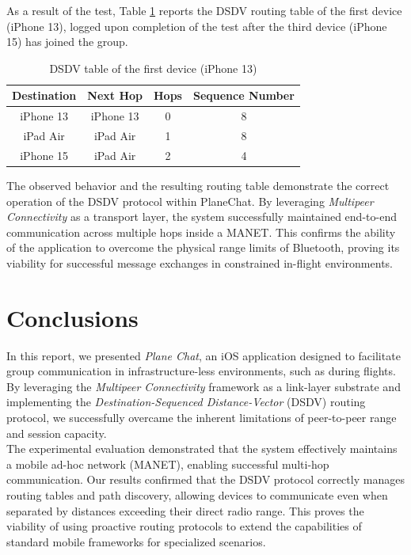 \documentclass[conference]{IEEEtran}
\begin{document}
As a result of the test, Table \ref{tab:dsdv_table} reports the
DSDV routing table of the first device (iPhone 13), logged upon completion of
the test after the third device (iPhone 15) has joined the group. \\

\begin{table}[htbp]
    \centering
    \caption{DSDV table of the first device (iPhone 13)}
    \label{tab:dsdv_table}
    \begin{tabular}{cccc}
        \toprule
        \textbf{Destination} & \textbf{Next Hop} & \textbf{Hops} & \textbf{Sequence
        Number} \\
        \midrule
        iPhone 13 & iPhone 13 & 0 & 8 \\
        iPad Air  & iPad Air  & 1 & 8 \\
        iPhone 15 & iPad Air  & 2 & 4 \\
        \bottomrule
    \end{tabular}
\end{table}

The observed behavior and the resulting routing table demonstrate the correct
operation of the DSDV protocol within PlaneChat. By leveraging \textit{Multipeer
Connectivity} as a transport layer, the system successfully maintained
end-to-end communication across multiple hops inside a MANET. This confirms the
ability of the application to overcome the physical range limits of Bluetooth,
proving its viability for successful message exchanges in constrained in-flight
environments.  

\section{Conclusions}
\label{sec:Conclusions}
In this report, we presented \textit{Plane Chat}, an iOS application designed to
facilitate group communication in infrastructure-less environments, such as
during flights. By leveraging the \textit{Multipeer Connectivity} framework as a
link-layer substrate and implementing the \textit{Destination-Sequenced
Distance-Vector} (DSDV) routing protocol, we successfully overcame the inherent
limitations of peer-to-peer range and session capacity.  \\

The experimental evaluation demonstrated that the system effectively maintains a
mobile ad-hoc network (MANET), enabling successful multi-hop communication. Our
results confirmed that the DSDV protocol correctly manages routing tables and
path discovery, allowing devices to communicate even when separated by distances
exceeding their direct radio range. This proves the viability of using proactive
routing protocols to extend the capabilities of standard mobile frameworks for
specialized scenarios. \\
\end{document}
